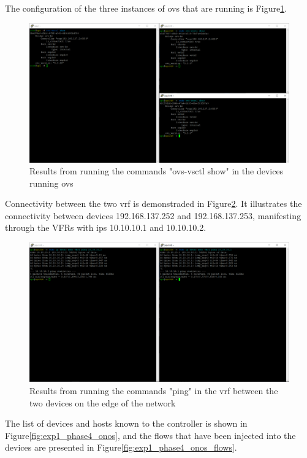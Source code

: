 The configuration of the three instances of \gls{ovs} that are running is Figure\ref{fig:exp1_phase4_config}.

\begin{figure}
	\centering
	\includegraphics[width=\textwidth]{Chapters/Figures/tests/ovs_phase_4/ovs_config.PNG}
	\caption{Results from running the commands "ovs-vsctl show" in the devices running \gls{ovs}}
	\label{fig:exp1_phase4_config}
\end{figure}

Connectivity between the two \gls{vrf} is demonstraded in Figure\ref{fig:exp1_phase4_pings}. It illustrates the connectivity between devices 192.168.137.252 and 192.168.137.253, manifesting through the VFRs with \glspl{ip} 10.10.10.1 and 10.10.10.2.

\begin{figure}
	\centering
	\includegraphics[width=\textwidth]{Chapters/Figures/tests/ovs_phase_4/pings.PNG}
	\caption{Results from running the commands "ping" in the \gls{vrf} between the two devices on the edge of the network}
	\label{fig:exp1_phase4_pings}
\end{figure}

The list of devices and hosts known to the controller is shown in Figure\ref{fig:exp1_phase4_onos}, and the flows that have been injected into the devices are presented in Figure\ref{fig:exp1_phase4_onos_flows}.

